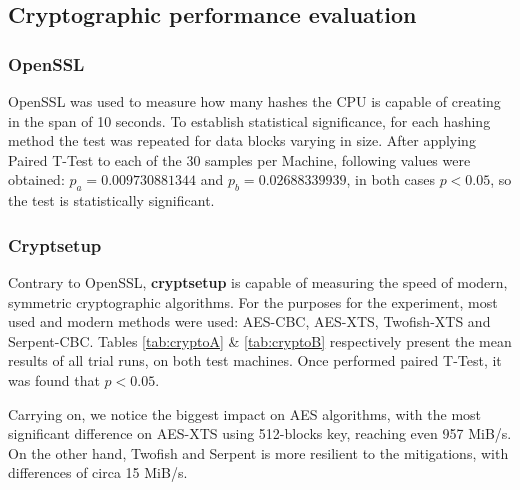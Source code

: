 \documentclass{csfourzero}
\begin{document}
\subsection{Cryptographic performance evaluation}

\subsubsection{OpenSSL}

OpenSSL was used to measure how many hashes the CPU is capable of creating in the span of 10 seconds. To establish statistical significance, for each hashing method the test was repeated for data blocks varying in size. After applying Paired T-Test to each of the 30 samples per Machine, following values were obtained: $p_{a} = 0.009730881344$ and $p_{b} = 0.02688339939$, in both cases $p < 0.05$, so the test is statistically significant.

\subsubsection{Cryptsetup}

Contrary to OpenSSL, \textbf{cryptsetup} is capable of measuring the speed of modern, symmetric cryptographic algorithms. For the purposes for the experiment, most used and modern methods were used: AES-CBC, AES-XTS, Twofish-XTS and Serpent-CBC. Tables \ref{tab:cryptoA} \& \ref{tab:cryptoB} respectively present the mean results of all trial runs, on both test machines. Once performed paired T-Test, it was found that $p < 0.05$.

Carrying on, we notice the biggest impact on AES algorithms, with the most significant difference on AES-XTS using 512-blocks key, reaching even 957 MiB/s. On the other hand, Twofish and Serpent is more resilient to the mitigations, with differences of circa 15 MiB/s. 
\end{document}
